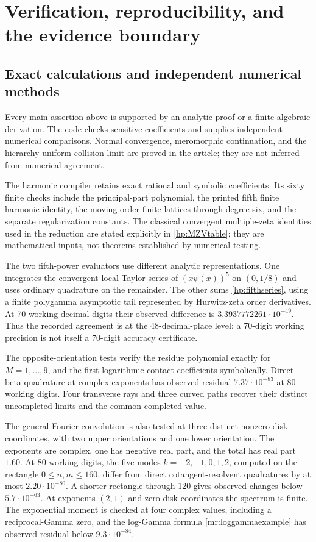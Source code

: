 \section{Verification, reproducibility, and the evidence boundary}
\label{verification:section}

\subsection{Exact calculations and independent numerical methods}

Every main assertion above is supported by an analytic proof or a finite
algebraic derivation. The code checks sensitive coefficients and supplies
independent numerical comparisons. Normal convergence, meromorphic
continuation, and the hierarchy-uniform collision limit are proved in
the article; they are not inferred from numerical agreement.

The harmonic compiler retains exact rational and symbolic coefficients.
Its sixty finite checks include the principal-part polynomial, the
printed fifth finite harmonic identity, the moving-order finite
lattices through degree six, and the separate regularization constants.
The classical convergent multiple-zeta identities used in the reduction
are stated explicitly in \eqref{hp:MZVtable}; they are mathematical
inputs, not theorems established by numerical testing.

The two fifth-power evaluators use different analytic representations.
One integrates the convergent local Taylor series of $(x\psi(x))^5$
on $(0,1/8)$ and uses ordinary quadrature on the remainder.
The other sums \eqref{hp:fifthseries}, using a finite polygamma
asymptotic tail represented by Hurwitz-zeta order derivatives.
At 70 working decimal digits their observed difference is
$3.3937772261\cdot10^{-49}$. Thus the recorded agreement is at the
48-decimal-place level; a 70-digit working precision is not itself
a 70-digit accuracy certificate.

The opposite-orientation tests verify the residue polynomial exactly
for $M=1,\ldots,9$, and the first logarithmic contact coefficients
symbolically. Direct beta quadrature at complex exponents has observed
residual $7.37\cdot10^{-83}$ at 80 working digits. Four transverse
rays and three curved paths recover their distinct uncompleted limits
and the common completed value.

The general Fourier convolution is also tested at three distinct
nonzero disk coordinates, with two upper orientations and one lower
orientation. The exponents are complex, one has negative real part,
and the total has real part $1.60$. At 80 working digits, the five modes
$k=-2,-1,0,1,2$, computed on the rectangle $0\le n,m\le160$, differ
from direct cotangent-resolvent quadratures by at most
$2.20\cdot10^{-80}$. A shorter rectangle through 120 gives observed
changes below $5.7\cdot10^{-63}$.
At exponents $(2,1)$ and zero disk coordinates the spectrum is finite.
The exponential moment is checked at four complex values, including
a reciprocal-Gamma zero, and the log-Gamma formula
\eqref{mr:loggammaexample} has observed residual below
$9.3\cdot10^{-84}$.

